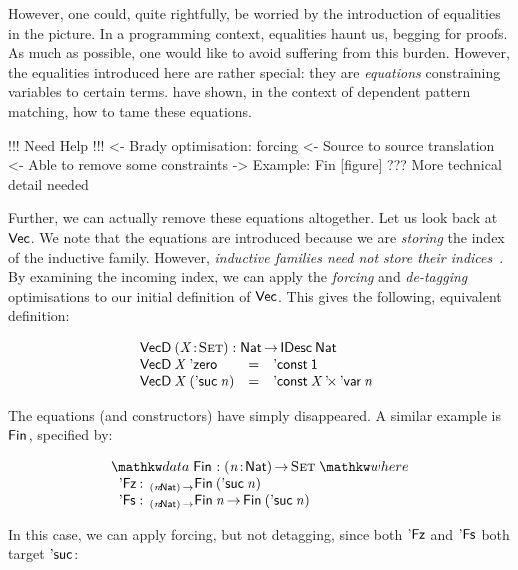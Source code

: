 However, one could, quite rightfully, be worried by the introduction
of equalities in the picture. In a programming context, equalities
haunt us, begging for proofs. As much as possible, one would like to
avoid suffering from this burden. However, the equalities introduced
here are rather special: they are \emph{equations} constraining
variables to certain terms. \citet{goguen:pattern-matching} have
shown, in the context of dependent pattern matching, how to tame these
equations.

\begin{wstructure}
!!! Need Help !!!
<- Brady optimisation: forcing
    <- Source to source translation
    <- Able to remove some constraints
    -> Example: Fin [figure]
    ??? More technical detail needed
\end{wstructure}

Further, we can actually remove these equations altogether. Let us
look back at $\D{Vec}$. We note that the equations are introduced
because we are \emph{storing} the index of the inductive family.
However, \emph{inductive families need not store their
  indices}~\cite{brady:index-inductive-families}.  By examining the
incoming index, we can apply the \emph{forcing} and \emph{de-tagging}
optimisations to our initial definition of $\D{Vec}$. This gives the
following, equivalent definition:

\[\stk{
\VecD \:\PITEL{\V{X}}{\Set} : \Nat \To \IDesc{\Nat} \\
\begin{array}{@{}lll}
\VecD\:\V{X}\: \NatZero     & = & \DConst{\Unit} \\
\VecD\:\V{X}\: (\NatSuc{\V{n}}) & = & \DProd{\DConst{\V{X}}}{\DVar{\V{n}}}
\end{array}
                                       
}\]

The equations (and constructors) have simply disappeared. A similar
example is $\Fin{\!}$, specified by:

\[
\stk{
\data \Fin{\!} : \PI{\V{n}}{\Nat} \Set \where \\
\;\;\begin{array}{@{}l@{\::\:\:}l@{\quad}l}
    \FinZero      & _{\PI{\V{n}}{\Nat}}\Fin{(\NatSuc{\V{n}})}   \\
    \FinSuc{\!}   & _{\PI{\V{n}}{\Nat}}\Fin{\V{n}} \To \Fin{(\NatSuc{\V{n}})}
\end{array}
}\]

In this case, we can apply forcing, but not detagging, since both
$\FinZero$ and $\FinSuc{\!}$ both target $\NatSuc{\!}$:

